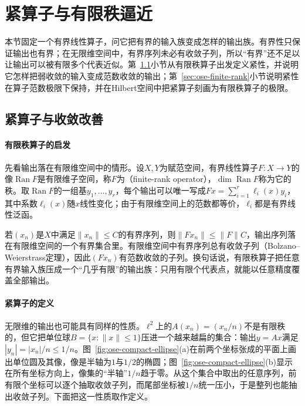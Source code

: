
\section{紧算子与有限秩逼近}
\label{sec:ose-compact}

本节固定一个有界线性算子，问它把有界的输入族变成怎样的输出族。有界性只保证输出也有界；在无限维空间中，有界序列未必有收敛子列，所以“有界”还不足以让输出可以被有限多个代表近似。第~\ref{sec:ose-compact-def}小节从有限秩算子出发定义紧性，并说明它怎样把弱收敛的输入变成范数收敛的输出；第~\ref{sec:ose-finite-rank}小节说明紧性在算子范数极限下保持，并在Hilbert空间中把紧算子刻画为有限秩算子的极限。

\subsection{紧算子与收敛改善}
\label{sec:ose-compact-def}

\paragraph{有限秩算子的启发}
先看输出落在有限维空间中的情形。设$X,Y$为赋范空间，有界线性算子$F:X\to Y$的像$\operatorname{Ran}F$是有限维子空间，称$F$为（finite-rank operator），$\dim\operatorname{Ran}F$称为它的秩。取$\operatorname{Ran}F$的一组基$y_1,\ldots,y_r$，每个输出可以唯一写成$Fx=\sum_{i=1}^{r}\ell_i(x)y_i$，其中系数$\ell_i(x)$随$x$线性变化；由于有限维空间上的范数都等价，$\ell_i$都是有界线性泛函。

若$(x_n)$是$X$中满足$\|x_n\|\leq C$的有界序列，则$\|Fx_n\|\leq\|F\|C$，输出序列落在有限维空间的一个有界集合里。有限维空间中有界序列总有收敛子列（Bolzano–Weierstrass定理），因此$(Fx_n)$有范数收敛的子列。换句话说，有限秩算子把任意有界输入族压成一个“几乎有限”的输出族：只用有限个代表点，就能以任意精度覆盖全部输出。

\paragraph{紧算子的定义}
无限维的输出也可能具有同样的性质。$\ell^2$上的$A(x_n)=(x_n/n)$不是有限秩的，但它把单位球$B=\{x:\|x\|\leq1\}$压进一个越来越扁的集合：输出$y=Ax$满足$|y_n|=|x_n|/n\leq1/n$。图~\ref{fig:ose-compact-ellipse}(a)在前两个坐标张成的平面上画出单位圆及其像，像是半轴为$1$与$1/2$的椭圆；图~\ref{fig:ose-compact-ellipse}(b)显示在所有坐标方向上，像集的“半轴”$1/n$趋于零。从这个集合中取出的任意序列，前有限个坐标可以逐个抽取收敛子列，而尾部坐标被$1/n$统一压小，于是整列也能抽出收敛子列。下面把这一性质取作定义。

